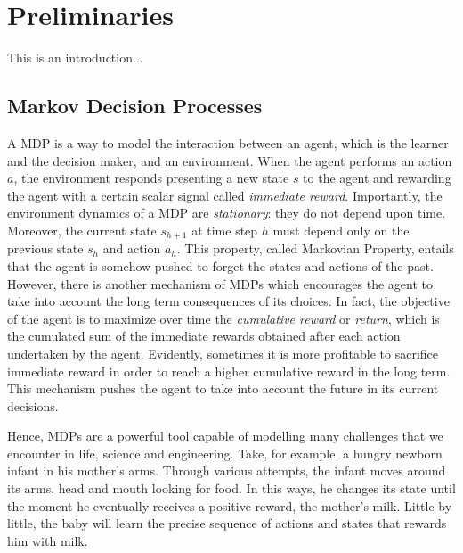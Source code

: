 
\chapter{Preliminaries}
This is an introduction...

\section{Markov Decision Processes}
A \gls{MDP} is a way to model the interaction between an agent, which is the learner and the decision maker, and an environment. When the agent performs an action $a$, the environment responds presenting a new state $s$ to the agent and rewarding the agent with a certain scalar signal called \emph{immediate reward}. Importantly, the environment dynamics of a \gls{MDP} are \emph{stationary}: they do not depend upon time. Moreover, the current state $s_{h+1}$ at time step $h$ must depend only on the previous state $s_{h}$ and action   $a_{h}$. This property, called Markovian Property, entails that the agent is somehow pushed to forget the states and actions of the past. However, there is another mechanism of \gls{MDP}s which encourages the agent to take into account the long term consequences of its choices. In fact, the objective of the agent is to maximize over time the  \emph{cumulative reward} or \emph{return}, which is the cumulated sum of the immediate rewards obtained after each action undertaken by the agent. Evidently, sometimes it is more profitable to sacrifice immediate reward in order to reach a higher cumulative reward in the long term. This mechanism pushes the agent to take into account the future in its current decisions. 

Hence, \gls{MDP}s are a powerful tool capable of modelling many challenges that we encounter in life, science and engineering. Take, for example, a hungry newborn infant in his mother's arms. Through various attempts, the infant moves around its arms, head and mouth looking for food. In this ways, he changes its state until the moment he eventually receives a positive reward, the mother's milk. Little by little, the baby will learn the precise sequence of actions and states that rewards him with milk.

